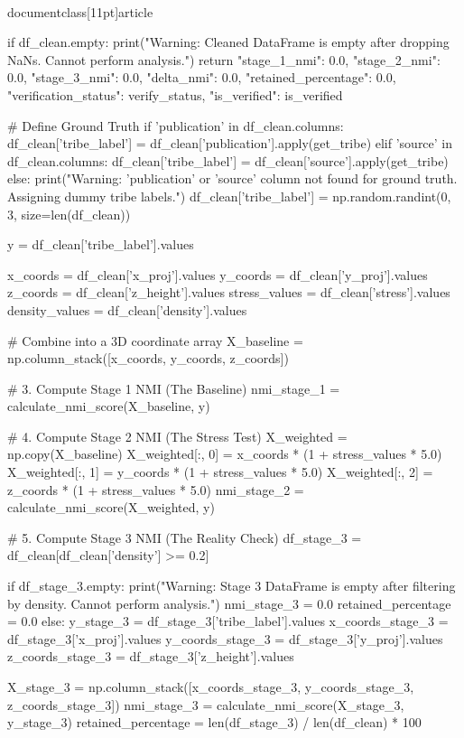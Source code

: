 \\documentclass[11pt]{article}
\begin{document}
\begin{CodeBlock}
    if df_clean.empty:
        print("Warning: Cleaned DataFrame is empty after dropping NaNs. Cannot perform analysis.")
        return {
            "stage_1_nmi": 0.0,
            "stage_2_nmi": 0.0,
            "stage_3_nmi": 0.0,
            "delta_nmi": 0.0,
            "retained_percentage": 0.0,
            "verification_status": verify_status,
            "is_verified": is_verified
        }

    # Define Ground Truth
    if 'publication' in df_clean.columns:
        df_clean['tribe_label'] = df_clean['publication'].apply(get_tribe)
    elif 'source' in df_clean.columns:
        df_clean['tribe_label'] = df_clean['source'].apply(get_tribe)
    else:
        print("Warning: 'publication' or 'source' column not found for ground truth. Assigning dummy tribe labels.")
        df_clean['tribe_label'] = np.random.randint(0, 3, size=len(df_clean))

    y = df_clean['tribe_label'].values

    x_coords = df_clean['x_proj'].values
    y_coords = df_clean['y_proj'].values
    z_coords = df_clean['z_height'].values
    stress_values = df_clean['stress'].values
    density_values = df_clean['density'].values

    # Combine into a 3D coordinate array
    X_baseline = np.column_stack([x_coords, y_coords, z_coords])

    # 3. Compute Stage 1 NMI (The Baseline)
    nmi_stage_1 = calculate_nmi_score(X_baseline, y)

    # 4. Compute Stage 2 NMI (The Stress Test)
    X_weighted = np.copy(X_baseline)
    X_weighted[:, 0] = x_coords * (1 + stress_values * 5.0)
    X_weighted[:, 1] = y_coords * (1 + stress_values * 5.0)
    X_weighted[:, 2] = z_coords * (1 + stress_values * 5.0)
    nmi_stage_2 = calculate_nmi_score(X_weighted, y)

    # 5. Compute Stage 3 NMI (The Reality Check)
    df_stage_3 = df_clean[df_clean['density'] >= 0.2]

    if df_stage_3.empty:
        print("Warning: Stage 3 DataFrame is empty after filtering by density. Cannot perform analysis.")
        nmi_stage_3 = 0.0
        retained_percentage = 0.0
    else:
        y_stage_3 = df_stage_3['tribe_label'].values
        x_coords_stage_3 = df_stage_3['x_proj'].values
        y_coords_stage_3 = df_stage_3['y_proj'].values
        z_coords_stage_3 = df_stage_3['z_height'].values

        X_stage_3 = np.column_stack([x_coords_stage_3, y_coords_stage_3, z_coords_stage_3])
        nmi_stage_3 = calculate_nmi_score(X_stage_3, y_stage_3)
        retained_percentage = len(df_stage_3) / len(df_clean) * 100


\end{CodeBlock}
\end{document}

